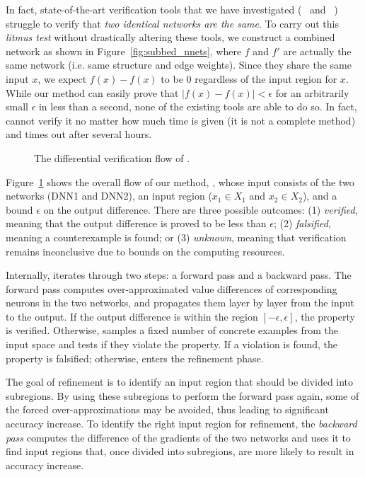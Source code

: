 In fact, state-of-the-art verification tools that we have investigated
(\ReluVal{}~\cite{WangPWYJ18} and \DeepPoly{}~\cite{SinghGPV19})
struggle to verify that \emph{two identical networks are the same}.
%
To carry out this \emph{litmus test} without drastically altering
these tools, we construct a combined network as shown in
Figure~\ref{fig:subbed_nnets}, where $f$ and $f'$ are actually the
same network (i.e. same structure and edge weights).  Since they share the same input
$x$, we expect $f(x)-f(x)$ to be 0 regardless of the input region for
$x$.  While our method can easily prove that $|f(x)-f(x)|< \epsilon$
for an arbitrarily small $\epsilon$ in less than a second,
none of the existing tools are able to do so.  In fact, \DeepPoly{}
cannot verify it no matter how much time is given (it is not a
complete method) and
\ReluVal{} times out after several hours.


\begin{figure}[t]
	\centering
\scalebox{1.0}{}
\caption{The differential verification flow of \diffNN{}.}
\label{fig:diagram}
\end{figure}


Figure~\ref{fig:diagram} shows the overall flow of our method,
\diffNN{}, whose  input consists of the two networks (DNN1 and DNN2),
an input region ($x_1\in X_1$ and $x_2\in X_2$), and a bound
$\epsilon$ on the output difference.
%
There are three possible outcomes: (1) \emph{verified}, meaning that
the output difference is proved to be less than $\epsilon$;
(2) \emph{falsified}, meaning a counterexample is found; or
(3) \emph{unknown}, meaning that verification remains inconclusive due
to bounds on the computing resources.



Internally, \diffNN{} iterates through two steps: a forward pass and a
backward pass.
%
The forward pass computes over-approximated value differences of
corresponding neurons in the two networks, and propagates them layer
by layer from the input to the output.
%
If the output difference is within the region $[-\epsilon, \epsilon]
$, the property is verified.
%
Otherwise, \diffNN{} samples a fixed number of concrete examples from
the input space and tests if they violate the property. If a violation
is found, the property is falsified; otherwise, \diffNN{} enters the
refinement phase.


The goal of refinement is to identify an input region that should be
divided into subregions.  By using these subregions to perform the
forward pass again, some of the forced over-approximations may be
avoided, thus leading to significant accuracy increase.
%
To identify the right input region for refinement, the \emph{backward
pass} computes the difference of the gradients of the two networks and
uses it to find input regions that, once divided into subregions, are
more likely to result in accuracy increase.


